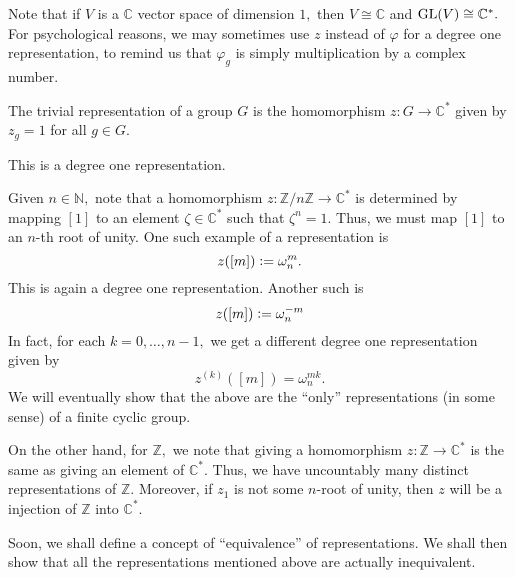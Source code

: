 Note that if $V$ is a $\mathbb{C}$ vector space of dimension $1,$ then $V \cong \mathbb{C}$ and $\operatorname{GL}(V) \cong \mathbb{C}^*.$ For psychological reasons, we may sometimes use $z$ instead of $\varphi$ for a degree one representation, to remind us that $\varphi_g$ is simply multiplication by a complex number.

\begin{ex} \label{ex:trivialrepresentation}
	The trivial representation of a group $G$ is the homomorphism $z:G \to \mathbb{C}^*$ given by $z_g = 1$ for all $g \in G.$ %

	This is a degree one representation.
\end{ex}

\begin{ex} \label{ex:ZnZCstardeg1}
	Given $n \in \mathbb{N},$ note that a homomorphism $z:\mathbb{Z}/n\mathbb{Z} \to \mathbb{C}^*$ is determined by mapping $[1]$ to an element $\zeta \in \mathbb{C}^*$ such that $\zeta^n = 1.$ Thus, we must map $[1]$ to an $n$-th root of unity. One such example of a representation is
	\begin{equation*} 
		z([m]) \vcentcolon= \omega_n^m.
	\end{equation*}
	This is again a degree one representation. Another such is
	\begin{equation*} 
		z([m]) \vcentcolon= \omega_n^{-m}
	\end{equation*}	
	In fact, for each $k = 0, \ldots, n - 1,$ we get a different degree one representation given by
	\begin{equation*} 
		z^{(k)}([m]) = \omega_n^{mk}.
	\end{equation*}
	We will eventually show that the above are the ``only'' representations (in some sense) of a finite cyclic group.

	On the other hand, for $\mathbb{Z},$ we note that giving a homomorphism $z:\mathbb{Z}\to\mathbb{C}^*$ is the same as giving an element of $\mathbb{C}^*.$ Thus, we have uncountably many distinct representations of $\mathbb{Z}.$ Moreover, if $z_1$ is not some $n$-root of unity, then $z$ will be a injection of $\mathbb{Z}$ into $\mathbb{C}^*.$
\end{ex}

Soon, we shall define a concept of ``equivalence'' of representations. We shall then show that all the representations mentioned above are actually inequivalent.

